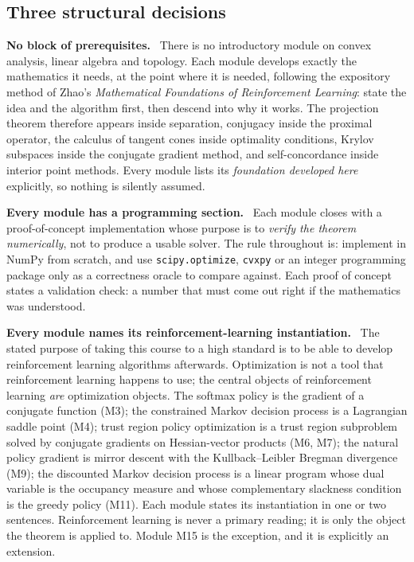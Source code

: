 \documentclass[11pt,a4paper]{article}
\newcommand{\mpart}[1]{\smallskip\noindent\textbf{#1}\ \ignorespaces}
\begin{document}
\subsection*{Three structural decisions}

\mpart{No block of prerequisites.} There is no introductory module on convex analysis, linear
algebra and topology. Each module develops exactly the mathematics it needs, at the point
where it is needed, following the expository method of Zhao's \emph{Mathematical Foundations
of Reinforcement Learning}: state the idea and the algorithm first, then descend into why it
works. The projection theorem therefore appears inside separation, conjugacy inside the
proximal operator, the calculus of tangent cones inside optimality conditions, Krylov
subspaces inside the conjugate gradient method, and self-concordance inside interior point
methods. Every module lists its \emph{foundation developed here} explicitly, so nothing is
silently assumed.

\mpart{Every module has a programming section.} Each module closes with a proof-of-concept
implementation whose purpose is to \emph{verify the theorem numerically}, not to produce a
usable solver. The rule throughout is: implement in NumPy from scratch, and use
\texttt{scipy.optimize}, \texttt{cvxpy} or an integer programming package only as a
correctness oracle to compare against. Each proof of concept states a validation check: a
number that must come out right if the mathematics was understood.

\mpart{Every module names its reinforcement-learning instantiation.} The stated purpose of
taking this course to a high standard is to be able to develop reinforcement learning
algorithms afterwards. Optimization is not a tool that reinforcement learning happens to use;
the central objects of reinforcement learning \emph{are} optimization objects. The softmax
policy is the gradient of a conjugate function (M3); the constrained Markov decision process
is a Lagrangian saddle point (M4); trust region policy optimization is a trust region
subproblem solved by conjugate gradients on Hessian-vector products (M6, M7); the natural
policy gradient is mirror descent with the Kullback--Leibler Bregman divergence (M9); the
discounted Markov decision process is a linear program whose dual variable is the occupancy
measure and whose complementary slackness condition is the greedy policy (M11). Each module
states its instantiation in one or two sentences. Reinforcement learning is never a primary
reading; it is only the object the theorem is applied to. Module M15 is the exception, and it
is explicitly an extension.
\end{document}
